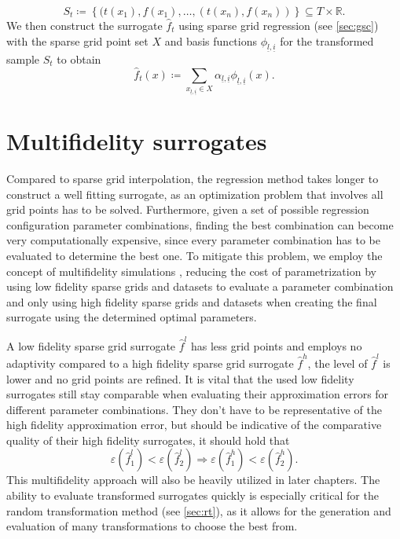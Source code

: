 \documentclass[
  a4paper,  %
  twoside,  %
  bibliography=totoc,
  headsepline,
  cleardoublepage=empty,
  parskip=half,
  draft=false
]{scrbook}
\begin{document}
\begin{equation}
S_t \coloneqq \left\{(t(x_1), f(x_1), \dots, (t(x_n), f(x_n))\right\} \subseteq T \times \mathds{R}.
\end{equation}
We then construct the surrogate $\hat{f}_t$ using sparse grid regression (see \cref{sec:gsc}) with the sparse grid point set $X$ and basis functions $\phi_{\underline{l},\underline{i}}$ for the transformed sample $S_t$ to obtain
\begin{equation}
\hat{f}_t(x) \coloneqq \sum_{x_{\underline{l},\underline{i}} \in X} \alpha_{\underline{l},\underline{i}} \phi_{\underline{l},\underline{i}}(x).
\end{equation}

\section{Multifidelity surrogates}
\label{sec:lofi}

Compared to sparse grid interpolation, the regression method takes longer to construct a well fitting surrogate, as an optimization problem that involves all grid points has to be solved.
Furthermore, given a set of possible regression configuration parameter combinations, finding the best combination can become very computationally expensive, since every parameter combination has to be evaluated to determine the best one.
To mitigate this problem, we employ the concept of multifidelity simulations \cite{Robinson2006}, \ie reducing the cost of parametrization by using low fidelity sparse grids and datasets to evaluate a parameter combination and only using high fidelity sparse grids and datasets when creating the final surrogate using the determined optimal parameters.

A low fidelity sparse grid surrogate $\hat{f}^l$ has less grid points and employs no adaptivity compared to a high fidelity sparse grid surrogate $\hat{f}^h$, \ie the level of $\hat{f}^l$ is lower and no grid points are refined.
It is vital that the used low fidelity surrogates still stay comparable when evaluating their approximation errors for different parameter combinations.
They don't have to be representative of the high fidelity approximation error, but should be indicative of the comparative quality of their high fidelity surrogates, \ie it should hold that
\begin{equation}
\varepsilon(\hat{f}_1^l) < \varepsilon(\hat{f}_2^l) \Rightarrow \varepsilon(\hat{f}_1^h) < \varepsilon(\hat{f}_2^h).
\end{equation}
%
This multifidelity approach will also be heavily utilized in later chapters.
The ability to evaluate transformed surrogates quickly is especially critical for the random transformation method (see \cref{sec:rt}), as it allows for the generation and evaluation of many transformations to choose the best from.
\end{document}
